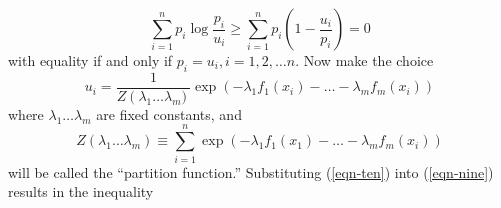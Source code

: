 \documentclass[]{article}
\begin{document}
\begin{equation}
\sum_{i = 1}^{n}  p_{i}\log\frac{p_{i}}{u_{i}} \geq \sum_{i = 1}^{n}  p_{i}\left( 1 - \frac{u_{i}}{p_{i}} \right) = 0 \label{eqn-nine}
\end{equation}
%
with equality if and only if \(p_{i} = u_{i},i = 1,2,\ldots n\). Now
make the choice
%
\begin{equation}
u_{i} = \frac{1}{Z\left( \lambda_{1}\ldots\lambda_{m}) \right.\ }\exp\left( - \lambda_{1}f_{1}\left( x_{i} \right) - \ldots - \lambda_{m}f_{m}\left( x_{i} \right) \right) \label{eqn-ten}
\end{equation}
%
where \(\lambda_{1}\ldots\lambda_{m}\) are fixed constants, and
%
\begin{equation}
Z\left( \lambda_{1}\ldots\lambda_{m} \right) \equiv \sum_{i = 1}^{n}  \exp\left( - \lambda_{1}f_{1}\left( x_{1} \right) - \ldots - \lambda_{m}f_{m}\left( x_{i} \right) \right) \label{eqn-eleven}
\end{equation}
%
will be called the ``partition function.'' Substituting (\ref{eqn-ten}) into (\ref{eqn-nine})
results in the inequality
\end{document}
